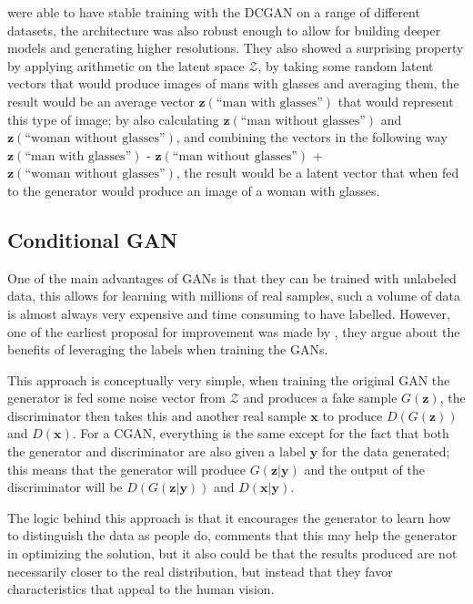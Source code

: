 \textcite{dcgan2015} were able to have stable training with the \gls{DCGAN} on a range of different datasets, the architecture was also robust enough to allow for building deeper models and generating higher resolutions. They also showed a surprising property by applying arithmetic on the latent space $\mathcal{Z}$, by taking some random latent vectors that would produce images of mans with glasses and averaging them, the result would be an average vector $\bm{z}(\text{``man with glasses''})$ that would represent this type of image; by also calculating $\bm{z}(\text{``man without glasses''})$ and $\bm{z}(\text{``woman without glasses''})$, and combining the vectors in the following way $\bm{z}(\text{``man with glasses''})$ - $\bm{z}(\text{``man without glasses''})$ + $\bm{z}(\text{``woman without glasses''})$, the result would be a latent vector that when fed to the generator would produce an image of a woman with glasses.

\subsection{Conditional GAN} \label{sub:cgan}
One of the main advantages of \acp{GAN} is that they can be trained with unlabeled data, this allows for learning with millions of real samples, such a volume of data is almost always very expensive and time consuming to have labelled. However, one of the earliest proposal for improvement was made by \textcite{conditionalGAN2014}, they argue about the benefits of leveraging the labels when training the \acp{GAN}.

This approach is conceptually very simple, when training the original \gls{GAN} the generator is fed some noise vector from $\mathcal{Z}$ and produces a fake sample $G(\bm{z})$, the discriminator then takes this and another real sample $\bm{x}$ to produce $D(G(\bm{z}))$ and $D(\bm{x})$. For a \gls{CGAN}, everything is the same except for the fact that both the generator and discriminator are also given a label $\bm{y}$ for the data generated; this means that the generator will produce $G(\bm{z} | \bm{y})$ and the output of the discriminator will be $D(G(\bm{z} | \bm{y}))$ and $D(\bm{x | \bm{y}})$.

The logic behind this approach is that it encourages the generator to learn how to distinguish the data as people do, \textcite{nipsGAN2017} comments that this may help the generator in optimizing the solution, but it also could be that the results produced are not necessarily closer to the real distribution, but instead that they favor characteristics that appeal to the human vision.

